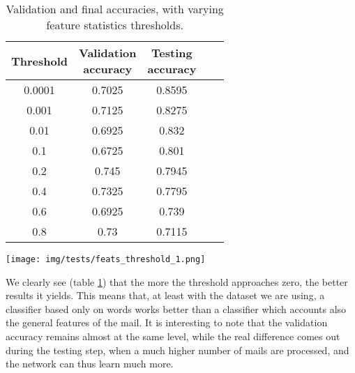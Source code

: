 \begin{center}
\begin{table}[h]%
\begin{minipage}{.5\linewidth}
\begin{center}
\begin{tabular}{ccccc}
\toprule
Threshold & \shortstack{Validation\\ accuracy} & \shortstack{Testing\\ accuracy} \\
\midrule
0.0001 & 0.7025 & 0.8595 \\
0.001  & 0.7125 & 0.8275 \\
0.01   & 0.6925 & 0.832  \\
0.1    & 0.6725 & 0.801  \\
0.2    & 0.745  & 0.7945 \\
0.4    & 0.7325 & 0.7795 \\
0.6    & 0.6925 & 0.739  \\
0.8    & 0.73   & 0.7115 \\
\bottomrule
\end{tabular}
\end{center}
\end{minipage}
\begin{minipage}{.5\linewidth}
\texttt{[image: img/tests/feats\_threshold\_1.png]}
    \label{fig:featuresthreshold}
\end{minipage}
\caption{Validation and final accuracies, with varying feature statistics thresholds.}
\label{tab:featsthr}
\end{table}
\end{center}

We clearly see (table \ref{tab:featsthr}) that the more the threshold approaches zero, the better results it yields. This means that, at least with the dataset we are using, a classifier based only on words works better than a classifier which accounts also the general features of the mail. It is interesting to note that the validation accuracy remains almost at the same level, while the real difference comes out during the testing step, when a much higher number of mails are processed, and the network can thus learn much more. 

